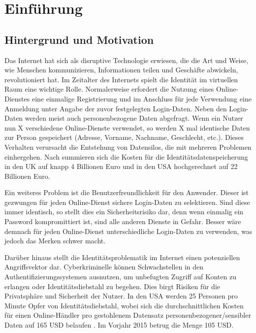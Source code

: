 \chapter{Einführung}
\label{cha:einfuehrung}

\section{Hintergrund und Motivation}
 
Das Internet hat sich als disruptive Technologie erwiesen, die die Art und Weise, wie Menschen kommunizieren, Informationen teilen und Geschäfte abwickeln, revolutioniert hat. Im Zeitalter des Internets spielt die Identität im virtuellen Raum eine wichtige Rolle. Normalerweise erfordert die Nutzung eines Online-Dienstes eine einmalige Registrierung und im Anschluss für jede Verwendung eine Anmeldung unter Angabe der zuvor festgelegten Login-Daten. Neben den Login-Daten werden meist auch personenbezogene Daten abgefragt. Wenn ein Nutzer nun X verschiedene Online-Dienste verwendet, so werden X mal identische Daten zur Person gespeichert (Adresse, Vorname, Nachname, Geschlecht, etc.). Dieses Verhalten verursacht die Entstehung von Datensilos, die mit mehreren Problemen einhergehen. Nach \cite{ID10} summieren sich die Kosten für die Identitätsdatenspeicherung in den UK auf knapp 4 Billionen Euro und in den USA hochgerechnet auf 22 Billionen Euro. 

Ein weiteres Problem ist die Benutzerfreundlichkeit für den Anwender. Dieser ist gezwungen für jeden Online-Dienst sichere Login-Daten zu selektieren. Sind diese immer identisch, so stellt dies ein Sicherheitsrisiko dar, denn wenn einmalig ein Password kompromittiert ist, sind alle anderen Dienste in Gefahr. Besser wäre demnach für jeden Online-Dienst unterschiedliche Login-Daten zu verwenden, was jedoch das Merken schwer macht.

Darüber hinaus stellt die Identitätsproblematik im Internet einen potenziellen Angriffsvektor dar. Cyberkriminelle können Schwachstellen in den Authentifizierungssystemen ausnutzen, um unbefugten Zugriff auf Konten zu erlangen oder Identitätsdiebstahl zu begehen. Dies birgt Risiken für die Privatsphäre und Sicherheit der Nutzer. In den USA werden 25 Personen pro Minute Opfer von Identitätsdiebstahl, wobei sich die durchschnittlichen Kosten für einen Online-Händler pro gestohlenem Datensatz personenbezogener/sensibler Daten auf 165 USD belaufen \cite{ID10}. Im Vorjahr 2015 betrug die Menge 105 USD.

